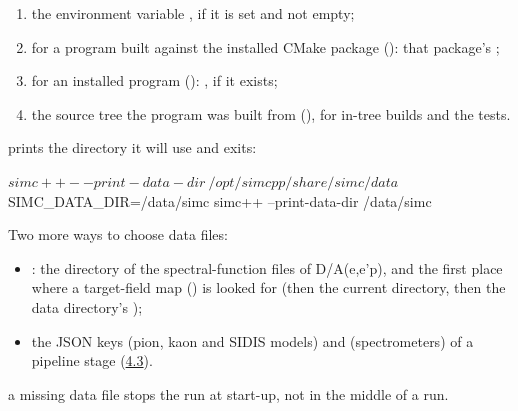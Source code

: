 \begin{enumerate}
\item the environment variable , if it is set and not empty;
\item for a program built against the installed CMake package (): that package's
;
\item for an installed program (): , if it exists;
\item the source tree the program was built from (), for in-tree builds and the tests.
\end{enumerate}
 prints the directory it will use and exits:

\begin{simcshell}[basicstyle=\ttfamily\footnotesize]
$ simc++ --print-data-dir
~/opt/simcpp/share/simc/data
$ SIMC_DATA_DIR=/data/simc simc++ --print-data-dir
/data/simc
\end{simcshell}
Two more ways to choose data files:

\begin{itemize}
\item {}: the directory of the spectral-function files of D/A(e,e'p), and the first place where a target-field
map (\hyperref[param:tgtu5ffieldu5ffile]{}) is looked for (then the current directory, then the data directory's );
\item the JSON keys  (pion, kaon and SIDIS models) and  (spectrometers) of a pipeline stage
(\hyperref[user_manual-04u5finputs:43-the-pipeline-section-choosing-plug-ins]{4.3}).
\end{itemize}
\begin{simcnote}
a missing data file stops the run at start-up, not in the middle of a run.
\end{simcnote}
